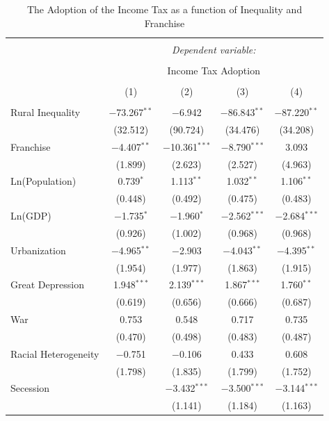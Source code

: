 \documentclass[letter, 12pt]{article}
\begin{document}
\begin{table}[!htbp] \centering 
	\caption{The Adoption of the Income Tax as a function of Inequality and Franchise} 
	\label{} 
	\begin{tabular}{@{\extracolsep{5pt}}lcccc} 
		\\[-1.8ex]\hline 
		\hline \\[-1.8ex] 
		& \multicolumn{4}{c}{\textit{Dependent variable:}} \\ 
		\cline{2-5} 
		\\[-1.8ex] & \multicolumn{4}{c}{Income Tax Adoption} \\ 
		\\[-1.8ex] & (1) & (2) & (3) & (4)\\ 
		\hline \\[-1.8ex] 
		Rural Inequality & $-$73.267$^{**}$ & $-$6.942 & $-$86.843$^{**}$ & $-$87.220$^{**}$ \\ 
		& (32.512) & (90.724) & (34.476) & (34.208) \\ 
		Franchise & $-$4.407$^{**}$ & $-$10.361$^{***}$ & $-$8.790$^{***}$ & 3.093 \\ 
		& (1.899) & (2.623) & (2.527) & (4.963) \\ 
		Ln(Population) & 0.739$^{*}$ & 1.113$^{**}$ & 1.032$^{**}$ & 1.106$^{**}$ \\ 
		& (0.448) & (0.492) & (0.475) & (0.483) \\ 
		Ln(GDP) & $-$1.735$^{*}$ & $-$1.960$^{*}$ & $-$2.562$^{***}$ & $-$2.684$^{***}$ \\ 
		& (0.926) & (1.002) & (0.968) & (0.968) \\ 
		Urbanization & $-$4.965$^{**}$ & $-$2.903 & $-$4.043$^{**}$ & $-$4.395$^{**}$ \\ 
		& (1.954) & (1.977) & (1.863) & (1.915) \\ 
		Great Depression & 1.948$^{***}$ & 2.139$^{***}$ & 1.867$^{***}$ & 1.760$^{**}$ \\ 
		& (0.619) & (0.656) & (0.666) & (0.687) \\ 
		War & 0.753 & 0.548 & 0.717 & 0.735 \\ 
		& (0.470) & (0.498) & (0.483) & (0.487) \\ 
		Racial Heterogeneity & $-$0.751 & $-$0.106 & 0.433 & 0.608 \\ 
		& (1.798) & (1.835) & (1.799) & (1.752) \\ 
		Secession &  & $-$3.432$^{***}$ & $-$3.500$^{***}$ & $-$3.144$^{***}$ \\ 
		&  & (1.141) & (1.184) & (1.163) \\ 

\end{tabular}
\end{table}
\end{document}
